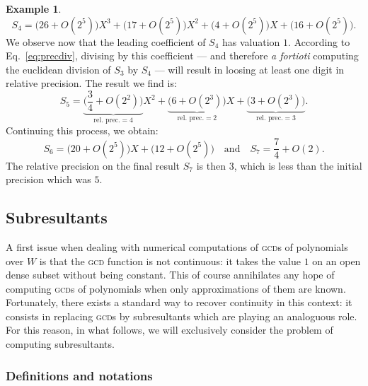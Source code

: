 \documentclass{jT}
\numberwithin{equation}{section}
\theoremstyle{definition}
\newtheorem{ex}[theo]{Example}
\newcommand{\A}{W}
\begin{document}
\begin{ex}
$$S_4 = 
      \big(26 + O(2^5)\big) X^3 +
      \big(17 + O(2^5)\big) X^2 +
      \big(4 + O(2^5)\big) X +
      \big(16 + O(2^5)\big).$$
We observe now that the leading coefficient of $S_4$ has valuation $1$. 
According to Eq.~\eqref{eq:precdiv}, divising by this coefficient ---
and therefore \emph{a fortioti} computing the euclidean division of 
$S_3$ by $S_4$ --- will result in loosing at least one digit in
relative precision. The result we find is:
$$S_5 = 
      \underbrace{\big(\textstyle \frac 3 4 + O(2^2)\big)}_{\text{rel. prec.} = 4} X^2 +
      \underbrace{\big(6 + O(2^3)\big)}_{\text{rel. prec.} = 2} X +
      \underbrace{\big(3 + O(2^3)\big)}_{\text{rel. prec.} = 3}.$$
Continuing this process, we obtain:
$$S_6 = 
      \big(20 + O(2^5)\big) X +
      \big(12 + O(2^5)\big) 
\quad \text{and} \quad
S_7 =
      \textstyle \frac 7 4 + O(2).$$
The relative precision on the final result $S_7$ is then $3$, which is
less than the initial precision which was $5$.
\end{ex}

\subsection{Subresultants}
\label{subsec:subres}

A first issue when dealing with numerical computations of \textsc{gcd}s 
of polynomials over $\A$ is that the \textsc{gcd} function is not 
continuous: it takes the value $1$ on an open dense subset without being 
constant. This of course annihilates any hope of computing \textsc{gcd}s 
of polynomials when only approximations of them are known. Fortunately, 
there exists a standard way to recover continuity in this context: it 
consists in replacing \textsc{gcd}s by subresultants which 
are playing an analoguous role. For this reason, in what follows, we will 
exclusively consider the problem of computing subresultants.

\subsubsection*{Definitions and notations}
\end{document}
